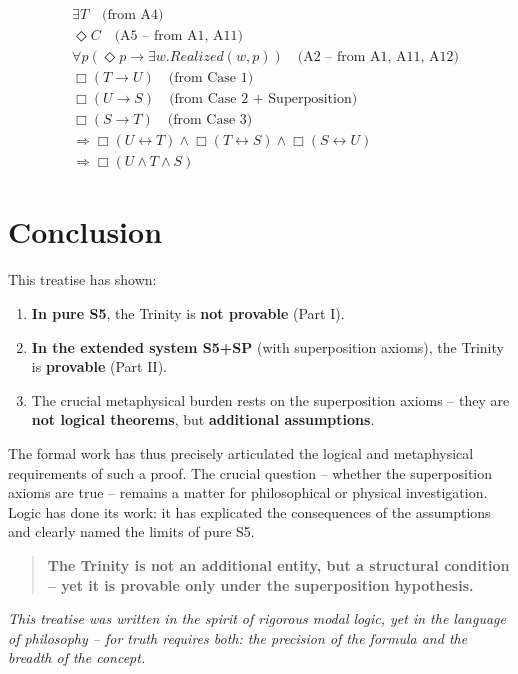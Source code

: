 \documentclass[
]{article}
\begin{document}
\[
\begin{aligned}
& \exists T \quad \text{(from A4)} \\
& \Diamond C \quad \text{(A5 – from A1, A11)} \\
& \forall p(\Diamond p \rightarrow \exists w. Realized(w,p)) \quad \text{(A2 – from A1, A11, A12)} \\
& \Box(T \rightarrow U) \quad \text{(from Case 1)} \\
& \Box(U \rightarrow S) \quad \text{(from Case 2 + Superposition)} \\
& \Box(S \rightarrow T) \quad \text{(from Case 3)} \\
& \Rightarrow \Box(U \leftrightarrow T) \land \Box(T \leftrightarrow S) \land \Box(S \leftrightarrow U) \\
& \Rightarrow \Box(U \land T \land S)
\end{aligned}
\]

\section{Conclusion}

This treatise has shown:

\begin{enumerate}
\item \textbf{In pure S5}, the Trinity is \textbf{not provable} (Part I).
\item \textbf{In the extended system S5+SP} (with superposition axioms), the Trinity is \textbf{provable} (Part II).
\item The crucial metaphysical burden rests on the superposition axioms – they are \textbf{not logical theorems}, but \textbf{additional assumptions}.
\end{enumerate}

The formal work has thus precisely articulated the logical and metaphysical requirements of such a proof. The crucial question – whether the superposition axioms are true – remains a matter for philosophical or physical investigation. Logic has done its work: it has explicated the consequences of the assumptions and clearly named the limits of pure S5.

\begin{quote}
\textbf{The Trinity is not an additional entity, but a structural condition – yet it is provable only under the superposition hypothesis.}
\end{quote}

\begin{center}
\emph{This treatise was written in the spirit of rigorous modal logic, yet in the language of philosophy – for truth requires both: the precision of the formula and the breadth of the concept.}
\end{center}
\end{document}
